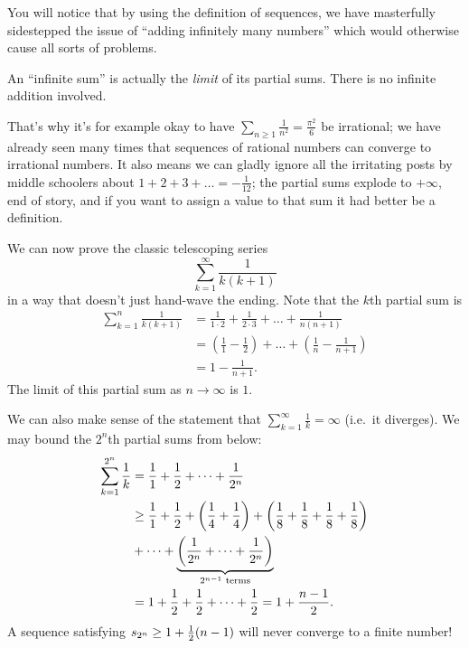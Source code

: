 You will notice that by using the definition of sequences,
we have masterfully sidestepped the issue of
``adding infinitely many numbers''
which would otherwise cause all sorts of problems.
\begin{moral}
	An ``infinite sum'' is actually the \emph{limit} of its partial sums.
	There is no infinite addition involved.
\end{moral}

That's why it's for example okay to have
$\sum_{n \ge 1} \frac{1}{n^2} = \frac{\pi^2}{6}$ be irrational;
we have already seen many times that sequences of rational
numbers can converge to irrational numbers.
It also means we can gladly ignore all the
irritating posts by middle schoolers about
$1+2+3+\dots = -\frac{1}{12}$;
the partial sums explode to $+\infty$, end of story,
and if you want to assign a value to that sum
it had better be a definition.

\begin{example}
	We can now prove the classic telescoping series
	\[ \sum_{k = 1}^\infty \frac{1}{k(k+1)} \]
	in a way that doesn't just hand-wave the ending.
	Note that the $k$th partial sum is
	\begin{align*}
		\sum_{k=1}^n \frac{1}{k(k+1)}
		&= \frac{1}{1 \cdot 2}
			+ \frac{1}{2 \cdot 3}
			+ \dots + \frac{1}{n(n+1)} \\
		&= \left( \frac11 - \frac12 \right)
			+ \dots + \left( \frac 1n - \frac{1}{n+1} \right) \\
		&= 1 - \frac{1}{n+1}.
	\end{align*}
	The limit of this partial sum as $n \to \infty$ is $1$.
\end{example}

\begin{example}
	We can also make sense of the statement
	that $\sum_{k=1}^\infty \frac 1k = \infty$
	(i.e.\ it diverges).
	We may bound the $2^n$th partial sums from below:
	\begin{align*}
		\sum_{k=1}^{2^n} \frac1k &= \frac11 + \frac12 + \dots + \frac1{2^n} \\
		&\ge \frac11 + \frac12 + \left( \frac14+\frac14 \right)
		+ \left( \frac18+\frac18+\frac18+\frac18 \right) \\
		&+ \dots  +
		\underbrace{\left( \frac{1}{2^n} + \dots + \frac{1}{2^n} \right)}_{2^{n-1} \text{ terms}} \\
		&= 1 + \frac{1}{2} + \frac{1}{2} + \dots + \frac{1}{2} = 1 + \frac{n-1}{2}.
	\end{align*}
	A sequence satisfying $s_{2^n} \ge 1 + \frac{1}{2}(n-1)$
	will never converge to a finite number!
\end{example}

